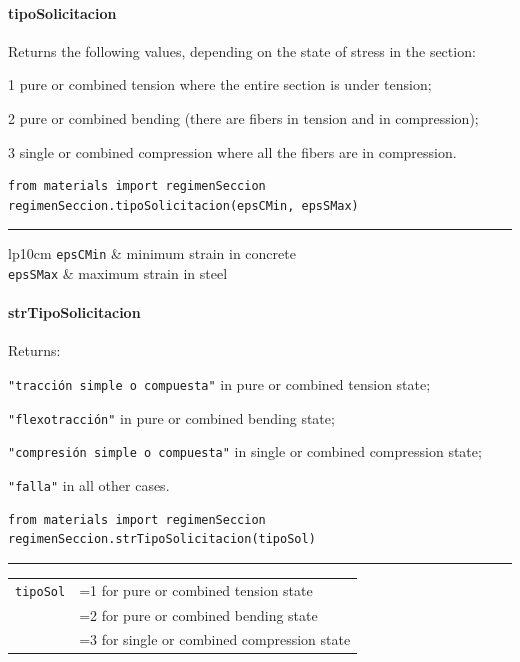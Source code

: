 \paragraph{tipoSolicitacion}
\noindent Returns the following values, depending on the state of stress in the section:
\begin{description}
\item{1} pure or combined tension where the entire section is under tension;
\item{2} pure or combined bending (there are fibers in tension and in compression);
\item{3} single or combined compression where all the fibers are in compression.
\end{description}
\begin{verbatim}
from materials import regimenSeccion
regimenSeccion.tipoSolicitacion(epsCMin, epsSMax)
\end{verbatim}
\vspace{-10pt}
{\color{grayLines} \rule{\linewidth}{0.25pt}}
\begin{center}
\begin{tabular}{lp{10cm}}
{\tt epsCMin} & minimum strain in concrete \\
{\tt epsSMax} & maximum strain in steel \\
\end{tabular}
\end{center}

\paragraph{strTipoSolicitacion}
\noindent Returns:
\begin{description}
\item{\verb|"tracción simple o compuesta"|} in pure or combined tension state;
\item{\verb|"flexotracción"|} in pure or combined bending state;
\item{\verb|"compresión simple o compuesta"|} in single or combined compression state;
\item{\verb|"falla"|} in all other cases.
\end{description}
\begin{verbatim}
from materials import regimenSeccion
regimenSeccion.strTipoSolicitacion(tipoSol)
\end{verbatim}
\vspace{-10pt}
{\color{grayLines} \rule{\linewidth}{0.25pt}}
\begin{center}
\begin{tabular}{lp{10cm}}
{\tt tipoSol} & =1 for pure or combined tension state \\
& =2 for pure or combined bending state \\
& =3 for single or combined compression state \\
\end{tabular}
\end{center}


